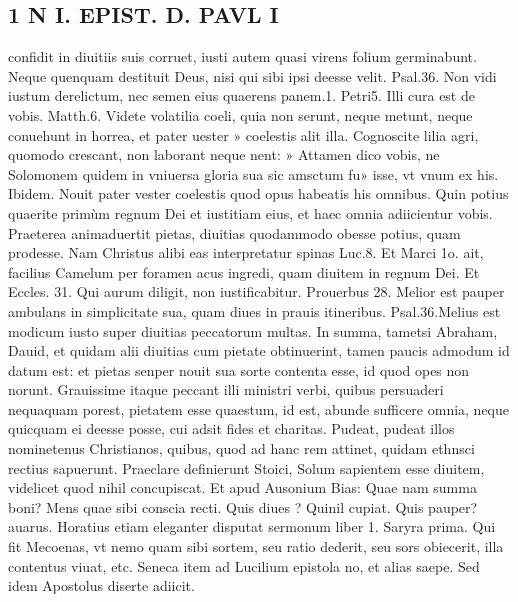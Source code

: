 \documentclass{article}
\begin{document}
\begin{pages}
\section*{1 N I. EPIST. D. PAVL I }
\marginpar{[ p.124 ]}\pstart confidit in diuitiis suis corruet, iusti autem quasi virens folium germinabunt. Neque quenquam destituit Deus, nisi qui sibi ipsi deesse velit. Psal.36. Non vidi iustum derelictum, nec semen eius quaerens panem.1. Petri5. Illi cura est de vobis. Matth.6. Videte volatilia coeli, quia non serunt, neque metunt, neque conuehunt in horrea, et pater uester » coelestis alit illa. Cognoscite lilia agri, quomodo crescant, non laborant neque nent: » Attamen dico vobis, ne Solomonem quidem in vniuersa gloria sua sic amsctum fu» isse, vt vnum ex his. Ibidem. Nouit pater vester coelestis quod opus habeatis his omnibus. Quin potius quaerite primùm regnum Dei et iustitiam eius, et haec omnia adiicientur vobis. Praeterea animaduertit pietas, diuitias quodammodo obesse potius, quam prodesse. Nam Christus alibi eas interpretatur spinas Luc.8. Et Marci 1o. ait, facilius Camelum per foramen acus ingredi, quam diuitem in regnum Dei. Et Eccles. 31. Qui aurum diligit, non iustificabitur. Prouerbus 28. Melior est pauper ambulans in simplicitate sua, quam diues in prauis itineribus. Psal.36.Melius est modicum iusto super diuitias peccatorum multas. In summa, tametsi Abraham, Dauid, et quidam alii diuitias cum pietate obtinuerint, tamen paucis admodum id datum est: et pietas senper nouit sua sorte contenta esse, id quod opes non norunt. Grauissime itaque peccant illi ministri verbi, quibus persuaderi nequaquam porest, pietatem esse quaestum, id est, abunde sufficere omnia, neque quicquam ei deesse posse, cui adsit fides et charitas. Pudeat, pudeat illos nominetenus Christianos, quibus, quod ad hanc rem attinet, quidam ethnsci rectius sapuerunt. Praeclare definierunt Stoici, Solum sapientem esse diuitem, videlicet quod nihil concupiscat. Et apud Ausonium Bias: Quae nam summa boni? Mens quae sibi conscia recti. Quis diues ? Quinil cupiat. Quis pauper? auarus. Horatius etiam eleganter disputat sermonum liber 1. Saryra prima. Qui fit Mecoenas, vt nemo quam sibi sortem, seu ratio dederit, seu sors obiecerit, illa contentus viuat, etc. Seneca item ad Lucilium epistola no, et alias saepe. Sed idem Apostolus diserte adiicit.  \pend
{}
{}

\end{pages}
\end{document}
